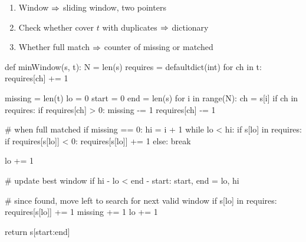 \begin{enumerate}
\item Window $\Rightarrow$ sliding window, two pointers
\item Check whether cover $t$ with duplicates $\Rightarrow$ dictionary
\item Whether full match $\Rightarrow$ counter of missing or matched
\end{enumerate}
\begin{python}
def minWindow(s, t):
  N = len(s)
  requires = defaultdict(int)
  for ch in t:
    requires[ch] += 1

  missing = len(t)
  lo = 0
  start = 0
  end = len(s)
  for i in range(N):
    ch = s[i]
    if ch in requires:
      if requires[ch] > 0:
        missing -= 1
      requires[ch] -= 1

    # when full matched
    if missing == 0:
      hi = i + 1
      while lo < hi:
        if s[lo] in requires: 
          if requires[s[lo]] < 0:
            requires[s[lo]] += 1
          else:
            break

        lo += 1

      # update best window
      if hi - lo < end - start:
        start, end = lo, hi
      
      # since found, move left to search for next valid window
      if s[lo] in requires:
        requires[s[lo]] += 1
        missing += 1
      lo += 1

  return s[start:end]
\end{python}
